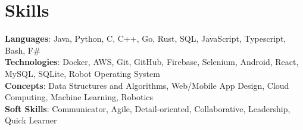 \documentclass[letterpaper,11pt]{article}
\begin{document}
\section{Skills}
 \begin{itemize}[leftmargin=0.15in, label={}]
    \small{\item{
     \textbf{Languages}{: Java, Python, C, C++, Go, Rust, SQL, JavaScript, Typescript, Bash, F\#} \\
     \textbf{Technologies}{: Docker, AWS, Git, GitHub, Firebase, Selenium, Android, React, MySQL, SQLite, Robot Operating System} \\
		 \textbf{Concepts}{: Data Structures and Algorithms, Web/Mobile App Design, Cloud Computing, Machine Learning, Robotics}\\
     \textbf{Soft Skills}{: Communicator, Agile, Detail-oriented, Collaborative, Leadership, Quick Learner} \\
    }}
 \end{itemize}


\end{document}
